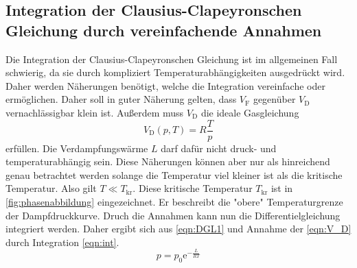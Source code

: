 \subsection{Integration der Clausius-Clapeyronschen Gleichung durch vereinfachende Annahmen}
\label{subsec:T_int}
Die Integration der Clausius-Clapeyronschen Gleichung ist im allgemeinen Fall schwierig, da sie durch kompliziert Temperaturabhängigkeiten ausgedrückt wird. Daher werden Näherungen benötigt, welche
die Integration vereinfache oder ermöglichen. Daher soll in guter Näherung gelten, dass $V_\text{F}$ gegenüber $V_\text{D}$ vernachlässigbar klein ist. Außerdem muss $V_\text{D}$ die ideale Gasgleichung
\begin{equation}
    \label{eqn:V_D}
    V_\text{D}(p,T) = R\frac{T}{p}
\end{equation} 
erfüllen. Die Verdampfungswärme $L$ darf dafür nicht druck- und temperaturabhängig sein. Diese Näherungen können aber nur als hinreichend genau betrachtet werden solange die Temperatur
viel kleiner ist als die kritische Temperatur. Also gilt $T \ll T_\text{kr}$. Diese kritische Temperatur $T_\text{kr}$ ist in \autoref{fig:phasenabbildung} eingezeichnet. Er beschreibt die "obere"
Temperaturgrenze der Dampfdruckkurve. Druch die Annahmen kann nun die Differentielgleichung integriert werden. Daher ergibt sich aus \autoref{eqn:DGL1} und Annahme der \autoref{eqn:V_D} durch Integration
\autoref{eqn:int}.
\begin{equation}
    \label{eqn:int}
    p = p_0\text{e}^{-\frac{L}{RT}}
\end{equation}
